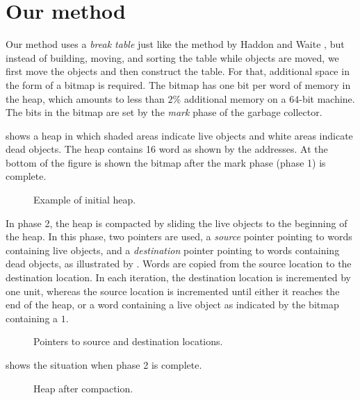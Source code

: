 \section{Our method}

Our method uses a \emph{break table} just like the method by Haddon
and Waite \cite{Haddon:1967}, but instead of building, moving, and
sorting the table while objects are moved, we first move the objects
and then construct the table.  For that, additional space in the form
of a bitmap is required.  The bitmap has one bit per word of
memory in the heap, which amounts to less than $2$\% additional memory
on a $64$-bit machine.  The bits in the bitmap are set by the
\emph{mark} phase of the garbage collector.

 shows a heap in which shaded areas indicate
live objects and white areas indicate dead objects.  The heap contains
16 word as shown by the addresses.  At the bottom of the figure is
shown the bitmap after the mark phase (phase 1) is complete.

\begin{figure}
\begin{center}
\end{center}
\caption{\label{fig-example-a}
Example of initial heap.}
\end{figure}

In phase 2, the heap is compacted by sliding the live objects to the
beginning of the heap.  In this phase, two pointers are used, a
\emph{source} pointer pointing to words containing live objects, and a
\emph{destination} pointer pointing to words containing dead objects,
as illustrated by .  Words are copied from the
source location to the destination location.  In each iteration, the
destination location is incremented by one unit, whereas the source
location is incremented until either it reaches the end of the heap,
or a word containing a live object as indicated by the bitmap
containing a $1$.

\begin{figure}
\begin{center}
\end{center}
\caption{\label{fig-example-b}
Pointers to source and destination locations.}
\end{figure}

 shows the situation when phase 2 is complete. 

\begin{figure}
\begin{center}
\end{center}
\caption{\label{fig-example-c}
Heap after compaction.}
\end{figure}

